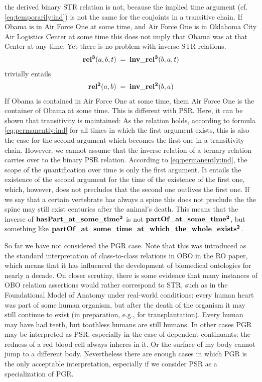 %
the derived binary STR relation is not, because the implied time argument (cf. \ref{eq:temporarily:ind}) is not the same for the conjoints in a transitive chain. If Obama is in Air Force One at some time, and Air Force One is in Oklahoma City Air Logistics Center at some time this does not imply that Obama was at that Center at any time.
Yet there is no problem with inverse STR relations. 
% 
\begin{equation}
\begin{split}
\mathrm{\mathbf{rel^3}}(a,b,t) \; = \; \mathrm{\mathbf{inv\_rel^3}}(b,a,t)  
\end{split}
\label{eq:trinv}
\end{equation}    
%
trivially entails
%
\begin{equation}
\begin{split}
\mathrm{\mathbf{rel^2}}(a,b) \; = \; \mathrm{\mathbf{inv\_rel^2}}(b,a)  
\end{split}
\label{eq:trinv2}
\end{equation}    
%
If Obama is contained in Air Force One at some time, them Air Force One is the container of Obama at some time.
%
This is different with PSR. Here, it can be shown that transitivity is maintained: As the relation holds, according to formula \ref{eq:permanently:ind} for all times in which the first argument exists, this is also the case for the second argument which becomes the first one in a transitivity chain.
However, we cannot assume that the inverse relation of a ternary relation carries over to the binary PSR relation. According to \ref{eq:permanently:ind}, the scope of the quantification over time is only the first argument. It entails the existence of the second argument for the time of the existence of the first one, which, however, does not precludes that the second one outlives the first one. If we say that a certain vertebrate has always a spine this does not preclude the the spine may still exist centuries after the animal's death.    
This means that the inverse of $\mathrm{\mathbf{hasPart\_at\_some\_time^2}}$ is not $\mathrm{\mathbf{partOf\_at\_some\_time^2}}$, but something like $\mathrm{\mathbf{partOf\_at\_some\_time\_at\_which\_the\_whole\_exists^2}}$.  

So far we have not considered the PGR case. Note that this was introduced as the standard interpretation of class-to-class relations in OBO in the RO paper, which means that it has influenced the development of biomedical ontologies for nearly a decade. On closer scrutiny, there is some evidence that many instances of OBO relation assertions would rather correspond to STR, such as in the Foundational Model of Anatomy under real-world conditions: every human heart was part of some human organism, but after the death of the organism it may still continue to exist (in preparation, e.g., for transplantation). Every human may have had teeth, but toothless humans are still humans. In other cases PGR may be interpreted as PSR, especially in the case of dependent continuants: the redness of a red blood cell always inheres in it. Or the surface of my body cannot jump to a different body. Nevertheless there are enough cases in which PGR is the only acceptable interpretation, especially if we consider PSR as a specialization of PGR.

